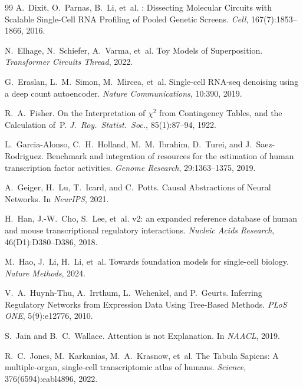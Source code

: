 \documentclass[11pt]{article}
\begin{document}
\begin{thebibliography}{99}
A.~Dixit, O.~Parnas, B.~Li, et~al.
: Dissecting Molecular Circuits with Scalable Single-Cell RNA Profiling of Pooled Genetic Screens.
\newblock \emph{Cell}, 167(7):1853--1866, 2016.

N.~Elhage, N.~Schiefer, A.~Varma, et~al.
\newblock Toy Models of Superposition.
\newblock \emph{Transformer Circuits Thread}, 2022.

G.~Eraslan, L.~M.~Simon, M.~Mircea, et~al.
\newblock Single-cell {RNA}-seq denoising using a deep count autoencoder.
\newblock \emph{Nature Communications}, 10:390, 2019.

R.~A.~Fisher.
\newblock On the Interpretation of $\chi^2$ from Contingency Tables, and the Calculation of~P.
\newblock \emph{J.~Roy.~Statist.~Soc.}, 85(1):87--94, 1922.

L.~Garcia-Alonso, C.~H.~Holland, M.~M.~Ibrahim, D.~Turei, and J.~Saez-Rodriguez.
\newblock Benchmark and integration of resources for the estimation of human transcription factor activities.
\newblock \emph{Genome Research}, 29:1363--1375, 2019.

A.~Geiger, H.~Lu, T.~Icard, and C.~Potts.
\newblock Causal Abstractions of Neural Networks.
\newblock In \emph{NeurIPS}, 2021.

H.~Han, J.-W.~Cho, S.~Lee, et~al.
 v2: an expanded reference database of human and mouse transcriptional regulatory interactions.
\newblock \emph{Nucleic Acids Research}, 46(D1):D380--D386, 2018.

M.~Hao, J.~Li, H.~Li, et~al.
\newblock Towards foundation models for single-cell biology.
\newblock \emph{Nature Methods}, 2024.

V.~A.~Huynh-Thu, A.~Irrthum, L.~Wehenkel, and P.~Geurts.
\newblock Inferring Regulatory Networks from Expression Data Using Tree-Based Methods.
\newblock \emph{PLoS ONE}, 5(9):e12776, 2010.

S.~Jain and B.~C.~Wallace.
\newblock Attention is not Explanation.
\newblock In \emph{NAACL}, 2019.

R.~C.~Jones, M.~Karkanias, M.~A.~Krasnow, et~al.
\newblock The Tabula Sapiens: A multiple-organ, single-cell transcriptomic atlas of humans.
\newblock \emph{Science}, 376(6594):eabl4896, 2022.


\end{thebibliography}
\end{document}
